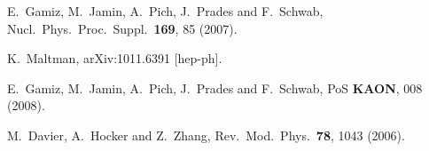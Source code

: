 \documentclass[fleqn,twoside]{article}
\begin{document}
\begin{thebibliography}{99}
  E.~Gamiz, M.~Jamin, A.~Pich, J.~Prades and F.~Schwab,
  Nucl.\ Phys.\ Proc.\ Suppl.\  {\bf 169}, 85 (2007).

  K.~Maltman,
  arXiv:1011.6391 [hep-ph].

  E.~Gamiz, M.~Jamin, A.~Pich, J.~Prades and F.~Schwab,
  PoS {\bf KAON}, 008 (2008).

  M.~Davier, A.~Hocker and Z.~Zhang,
  Rev.\ Mod.\ Phys.\  {\bf 78}, 1043 (2006).


\end{thebibliography}
\end{document}
